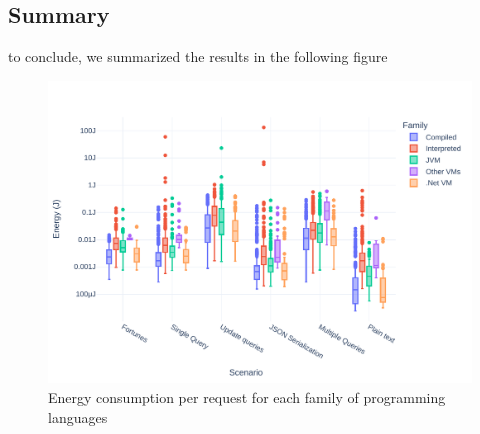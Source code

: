 \subsection{Summary}
to conclude, we summarized the results in the following figure
\begin{figure}[bht]
    \centering
    \includegraphics[width=.9\columnwidth ]{imgs/all_boxplot}
    \caption{Energy consumption per request for each family of programming languages}
    \label{fig:all_boxplot}
\end{figure}
